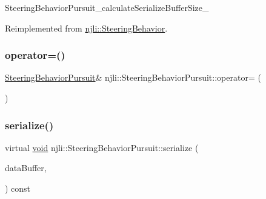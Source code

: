 \begin{DoxyCodeInclude}
\end{DoxyCodeInclude}
Steering\+Behavior\+Pursuit\+\_\+calculate\+Serialize\+Buffer\+Size\+\_\+ 

Reimplemented from \mbox{\hyperlink{classnjli_1_1_steering_behavior_acd7af46e42a8a3fc1208a47f50836ac8}{njli\+::\+Steering\+Behavior}}.

\mbox{\label{classnjli_1_1_steering_behavior_pursuit_a6bc580bff0689c9ec9c1426483d7a07c}} 
\subsubsection{\texorpdfstring{operator=()}{operator=()}}
{\footnotesize\ttfamily \mbox{\hyperlink{classnjli_1_1_steering_behavior_pursuit}{Steering\+Behavior\+Pursuit}}\& njli\+::\+Steering\+Behavior\+Pursuit\+::operator= (\begin{DoxyParamCaption}\item[{const \mbox{\hyperlink{classnjli_1_1_steering_behavior_pursuit}{Steering\+Behavior\+Pursuit}} \&}]{ }\end{DoxyParamCaption})\hspace{0.3cm}{\ttfamily [protected]}}

\mbox{\label{classnjli_1_1_steering_behavior_pursuit_a10a5320c1971fc7ab685b996d5e39fa2}} 
\subsubsection{\texorpdfstring{serialize()}{serialize()}}
{\footnotesize\ttfamily virtual \mbox{\hyperlink{_thread_8h_af1e856da2e658414cb2456cb6f7ebc66}{void}} njli\+::\+Steering\+Behavior\+Pursuit\+::serialize (\begin{DoxyParamCaption}\item[{\mbox{\hyperlink{_thread_8h_af1e856da2e658414cb2456cb6f7ebc66}{void}} $\ast$}]{data\+Buffer,  }\item[{bt\+Serializer $\ast$}]{ }\end{DoxyParamCaption}) const\hspace{0.3cm}{\ttfamily [virtual]}}



